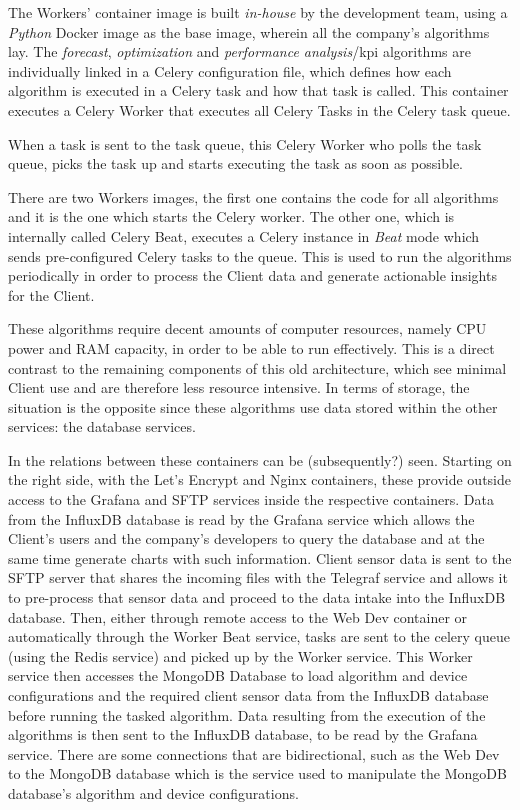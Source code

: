 The Workers' container image is built \textit{in-house} by the development team, using a \textit{Python} Docker image as the base image, wherein all the company's algorithms lay. The \textit{forecast}, \textit{optimization} and \textit{performance analysis}/\gls{kpi} algorithms are individually linked in a Celery configuration file, which defines how each algorithm is executed in a Celery task and how that task is called. This container executes a Celery Worker that executes all Celery Tasks in the Celery task queue.

When a task is sent to the task queue, this Celery Worker who polls the task queue, picks the task up and starts executing the task as soon as possible.

There are two Workers images, the first one contains the code for all algorithms and it is the one which starts the Celery worker. The other one, which is internally called Celery Beat, executes a Celery instance in \textit{Beat} mode which sends pre-configured Celery tasks to the queue. This is used to run the algorithms periodically in order to process the Client data and generate actionable insights for the Client.

These algorithms require decent amounts of computer resources, namely CPU power and RAM capacity, in order to be able to run effectively. This is a direct contrast to the remaining components of this old architecture, which see minimal Client use and are therefore less resource intensive. In terms of storage, the situation is the opposite since these algorithms use data stored within the other services: the database services.



In  the relations between these containers can be (subsequently?) seen. Starting on the right side, with the  Let's Encrypt and Nginx containers, these provide outside access to the Grafana and SFTP services inside the respective containers. Data from the InfluxDB database is read by the Grafana service which allows the Client's users and the company's developers to query the database and at the same time generate charts with such information. Client sensor data is sent to the SFTP server that shares the incoming files with the Telegraf service and allows it to pre-process that sensor data and proceed to the data intake into the InfluxDB database. Then, either through remote access to the Web Dev container or automatically through the Worker Beat service, tasks are sent to the celery queue (using the Redis service) and picked up by the Worker service. This Worker service then accesses the MongoDB Database to load algorithm and device configurations and the required client sensor data from the InfluxDB database before running the tasked algorithm. Data resulting from the execution of the algorithms is then sent to the InfluxDB database, to be read by the Grafana service. There are some connections that are bidirectional, such as the Web Dev to the MongoDB database which is the service used to manipulate the MongoDB database's algorithm and device configurations.

